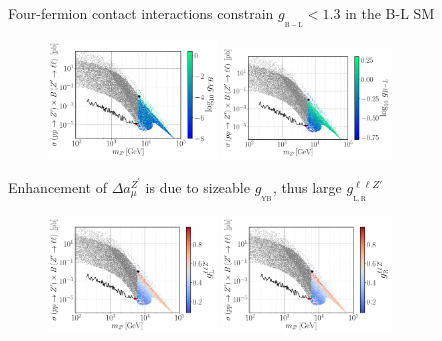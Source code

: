 \documentclass[10pt,xcolor=dvipsnames,mathserif]{beamer}
\newcommand{\g}[2]{g_{_\mathrm{#1}}^{#2}}
\begin{document}
\begin{frame}
	Four-fermion contact interactions constrain $\g{B-L}{} < 1.3$ in the B-L SM
	\begin{figure}[!h]
		\includegraphics[width=0.40\textwidth]{Images/BLSM_2/mZp_Xsec_gYB.pdf}
		\includegraphics[width=0.40\textwidth]{Images/BLSM_2/mZp_Xsec_gBL.pdf}
	\end{figure}	
	Enhancement of $\Delta a_\mu^{Z^\prime}$ is due to sizeable $\g{YB}{}$, thus large $\g{L,R}{\ell \ell Z'}$
\begin{figure}[!h]
	\includegraphics[width=0.40\textwidth]{Images/BLSM_2/mZp_Xsec_gLmumuZ.pdf}
	\includegraphics[width=0.40\textwidth]{Images/BLSM_2/mZp_Xsec_gRmumuZ.pdf}
\end{figure}	
\end{frame}
\end{document}
